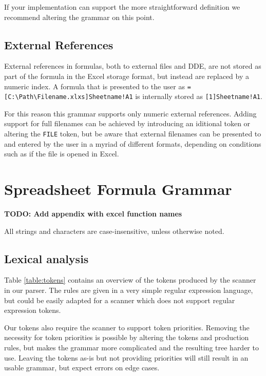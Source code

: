 \documentclass[conference]{IEEEtran}
\newcommand{\todo}[1]{\textbf{TODO: #1}}
\begin{document}
If your implementation can support the more straightforward definition we recommend altering the grammar on this point.

\subsection{External References}

External references in formulas, both to external files and DDE, are not stored as part of the formula in the Excel storage format, but instead are replaced by a numeric index.
A formula that is presented to the user as \texttt{=[C:\textbackslash Path\textbackslash Filename.xlxs]Sheetname!A1} is internally stored as \texttt{[1]Sheetname!A1}.

For this reason this grammar supports only numeric external references.
Adding support for full filenames can be achieved by introducing an iditional token or altering the \texttt{FILE} token, but be aware that external filenames can be presented to and entered by the user in a myriad of different formats, depending on conditions such as if the file is opened in Excel.

\section{Spreadsheet Formula Grammar}
\label{section:grammar}

\todo{Add appendix with excel function names}

All strings and characters are case-insensitive, unless otherwise noted.

\subsection{Lexical analysis}

Table \ref{table:tokens} contains an overview of the tokens produced by the scanner in our parser. The rules are given in a very simple regular expression language, but could be easily adapted for a scanner which does not support regular expression tokens. 

Our tokens also require the scanner to support token priorities. Removing the necessity for token priorities is possible by altering the tokens and production rules, but makes the grammar more complicated and the resulting tree harder to use. Leaving the tokens as-is but not providing priorities will still result in an usable grammar, but expect errors on edge cases.
\end{document}
